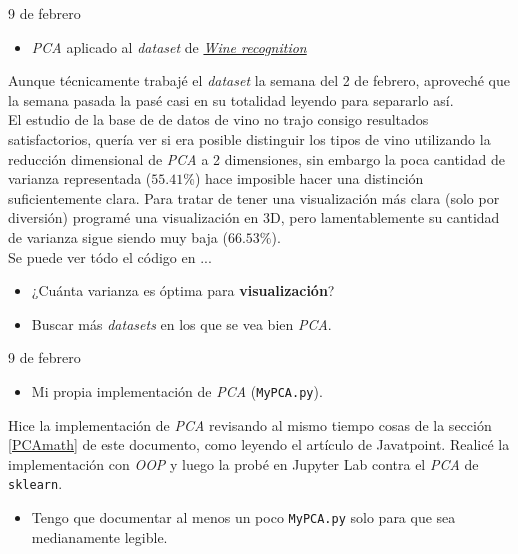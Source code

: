 \begin{entry}{9 de febrero}
\tcbsubtitle{\LBlimportant}
\begin{itemize}
    \item \textit{PCA} aplicado al \textit{dataset} de \href{https://scikit-learn.org/stable/modules/generated/sklearn.datasets.load_wine.html}{\textit{Wine recognition}}
\end{itemize}
\tcblower
\tcbsubtitle{\LBlsummary}
Aunque técnicamente trabajé el \textit{dataset} la semana del 2 de febrero, aproveché que la semana pasada la pasé casi en su totalidad leyendo para separarlo así.\\

El estudio de la base de de datos de vino no trajo consigo resultados satisfactorios, quería ver si era posible distinguir los tipos de vino utilizando la reducción dimensional de \textit{PCA} a 2 dimensiones, sin embargo la poca cantidad de varianza representada ($55.41\%$) hace imposible hacer una distinción suficientemente clara. Para tratar de tener una visualización más clara (solo por diversión) programé una visualización en 3D, pero lamentablemente su cantidad de varianza sigue siendo muy baja ($66.53\%$).\\

Se puede ver tódo el código en ...
\vspace{0.4em}
\tcbsubtitle{\LBltodo}\vspace{-1.25em}
\begin{itemize}
    \item ¿Cuánta varianza es óptima para \textbf{visualización}?
    \item Buscar más \textit{datasets} en los que se vea bien \textit{PCA}.
\end{itemize}
\end{entry}

\begin{entry}{9 de febrero}
\tcbsubtitle{\LBlimportant}
\begin{itemize}
    \item Mi propia implementación de \textit{PCA} (\texttt{MyPCA.py}).
\end{itemize}
\tcblower
\tcbsubtitle{\LBlsummary}
Hice la implementación de \textit{PCA} revisando al mismo tiempo cosas de la sección \ref{PCAmath} de este documento, como leyendo el artículo de Javatpoint. Realicé la implementación con \textit{OOP} y luego la probé en Jupyter Lab contra el \textit{PCA} de \texttt{sklearn}.
\vspace{0.4em}
\tcbsubtitle{\LBltodo}\vspace{-1.25em}
\begin{itemize}
    \item Tengo que documentar al menos un poco \texttt{MyPCA.py} solo para que sea medianamente legible.
\end{itemize}
\end{entry}

